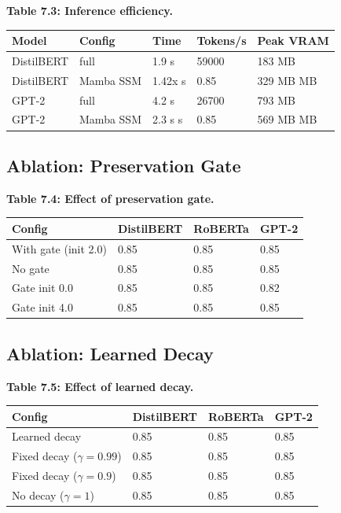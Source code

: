 \textbf{Table 7.3: Inference efficiency.}

\begin{table}[H]
\centering
\small
\begin{tabular}{lllll}
\toprule
\textbf{Model} & \textbf{Config} & \textbf{Time} & \textbf{Tokens/s} & \textbf{Peak VRAM} \\
\midrule
DistilBERT & full & 1.9 s & 59000 & 183 MB \\
DistilBERT & Mamba SSM & 1.42x s & 0.85 & 329 MB MB \\
GPT-2 & full & 4.2 s & 26700 & 793 MB \\
GPT-2 & Mamba SSM & 2.3 s s & 0.85 & 569 MB MB \\
\bottomrule
\end{tabular}
\end{table}

\subsection{Ablation: Preservation Gate}

\textbf{Table 7.4: Effect of preservation gate.}

\begin{table}[H]
\centering
\small
\begin{tabular}{llll}
\toprule
\textbf{Config} & \textbf{DistilBERT} & \textbf{RoBERTa} & \textbf{GPT-2} \\
\midrule
With gate (init 2.0) & 0.85 & 0.85 & 0.85 \\
No gate & 0.85 & 0.85 & 0.85 \\
Gate init 0.0 & 0.85 & 0.85 & 0.82 \\
Gate init 4.0 & 0.85 & 0.85 & 0.85 \\
\bottomrule
\end{tabular}
\end{table}

\subsection{Ablation: Learned Decay}

\textbf{Table 7.5: Effect of learned decay.}

\begin{table}[H]
\centering
\small
\begin{tabular}{llll}
\toprule
\textbf{Config} & \textbf{DistilBERT} & \textbf{RoBERTa} & \textbf{GPT-2} \\
\midrule
Learned decay & 0.85 & 0.85 & 0.85 \\
Fixed decay ($\gamma = 0.99$) & 0.85 & 0.85 & 0.85 \\
Fixed decay ($\gamma = 0.9$) & 0.85 & 0.85 & 0.85 \\
No decay ($\gamma = 1$) & 0.85 & 0.85 & 0.85 \\
\bottomrule
\end{tabular}
\end{table}

